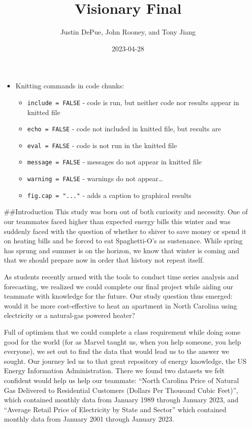 \documentclass[
]{article}
\title{Visionary Final}
\author{Justin DePue, John Rooney, and Tony Jiang}
\date{2023-04-28}
\providecommand{\tightlist}{%
  \setlength{\itemsep}{0pt}\setlength{\parskip}{0pt}}
\begin{document}
\maketitle

{
\setcounter{tocdepth}{3}
\tableofcontents
}
\begin{itemize}
\tightlist
\item
  Knitting commands in code chunks:

  \begin{itemize}
  \tightlist
  \item
    \texttt{include\ =\ FALSE} - code is run, but neither code nor
    results appear in knitted file
  \item
    \texttt{echo\ =\ FALSE} - code not included in knitted file, but
    results are
  \item
    \texttt{eval\ =\ FALSE} - code is not run in the knitted file
  \item
    \texttt{message\ =\ FALSE} - messages do not appear in knitted file
  \item
    \texttt{warning\ =\ FALSE} - warnings do not appear\ldots{}
  \item
    \texttt{fig.cap\ =\ "..."} - adds a caption to graphical results
  \end{itemize}
\end{itemize}

\#\#Introduction This study was born out of both curiosity and
necessity. One of our teammates faced higher than expected energy bills
this winter and was suddenly faced with the question of whether to
shiver to save money or spend it on heating bills and be forced to eat
Spaghetti-O's as sustenance. While spring has sprung and summer is on
the horizon, we know that winter is coming and that we should prepare
now in order that history not repeat itself.

As students recently armed with the tools to conduct time series
analysis and forecasting, we realized we could complete our final
project while aiding our teammate with knowledge for the future. Our
study question thus emerged: would it be more cost-effective to heat an
apartment in North Carolina using electricity or a natural-gas powered
heater?

Full of optimism that we could complete a class requirement while doing
some good for the world (for as Marvel taught us, when you help someone,
you help everyone), we set out to find the data that would lead us to
the answer we sought. Our journey led us to that great repository of
energy knowledge, the US Energy Information Administration. There we
found two datasets we felt confident would help us help our teammate:
``North Carolina Price of Natural Gas Delivered to Residential Customers
(Dollars Per Thousand Cubic Feet)'', which contained monthly data from
January 1989 through January 2023, and ``Average Retail Price of
Electricity by State and Sector'' which contained monthly data from
January 2001 through January 2023.
\end{document}
